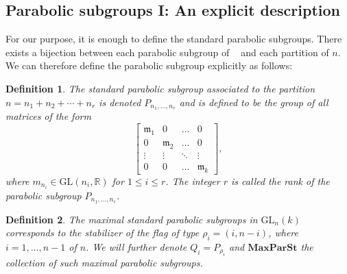 \documentclass[12pt]{article} %
\newtheorem{definition}{Definition}[section]
\DeclareMathOperator{\SLn}{\text{SL}_n(\mathbb{R})}
\begin{document}
\subsection{Parabolic subgroups I: An explicit description }
For our purpose, it is enough to define the standard parabolic subgroups.  There exists a bijection between each parabolic subgroup of $\SLn$
and each partition of $n$. We can therefore define the parabolic subgroup explicitly as follows: 
\begin{definition}
    The standard parabolic subgroup associated to the partition $n = n_1 + n_2 + \cdots + n_r$ is denoted $P_{n_1,\ldots,n_r}$ and is defined to be the group of all matrices of the form
\[
 \begin{bmatrix}
        \mathfrak{m}_1 & 0              & \ldots & 0              \\
        0              & \mathfrak{m}_2 & \ldots & 0              \\
        \vdots         & \vdots         & \ddots & \vdots         \\
        0              & 0              & \ldots & \mathfrak{m}_k
    \end{bmatrix} ,
\]
where $m_{n_i} \in \mathrm{GL}(n_i, \mathbb{R})$ for $1 \leq i \leq r$. The integer $r$ is called the rank of the parabolic subgroup $P_{n_1,\ldots,n_r}$.
\end{definition}

\begin{definition}
    The maximal standard parabolic subgroups in $\text{GL}_n(k)$ corresponds to the
    stabilizer of the flag of type $\rho_i =(i,n-i)$, where $i = 1,\ldots,n-1$ of $n$. We will
    further denote $Q_i = P_{\rho_i}$ and $\textbf{MaxParSt}$ the collection of such maximal parabolic subgroups.
\end{definition}
\end{document}
